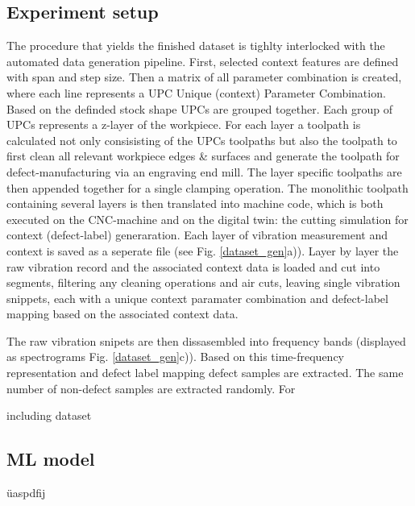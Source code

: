 \documentclass[5p,times,procedia]{elsarticle}
\begin{document}
\subsection{Experiment setup}
\vspace*{-\baselineskip}
The procedure that yields the finished dataset is tighlty interlocked with the automated data generation pipeline.
First, selected context features are defined with span and step size. Then a matrix of all parameter combination is created, where each line represents a UPC Unique (context) Parameter Combination. 
Based on the definded stock shape UPCs are grouped together. Each group of UPCs represents a z-layer of the workpiece. For each layer a toolpath is calculated not only consisisting of the UPCs toolpaths but also the toolpath to first clean all relevant workpiece edges \& surfaces and generate the toolpath for defect-manufacturing via an engraving end mill.
The layer specific toolpaths are then appended together for a single clamping operation.
The monolithic toolpath containing several layers is then translated into machine code, which is both executed on the CNC-machine and on the digital twin: the cutting simulation for context (defect-label) generaration. Each layer of vibration measurement and context is saved as a seperate file (see Fig. \ref{dataset_gen}a)).
Layer by layer the raw vibration record and the associated context data is loaded and cut into segments, filtering any cleaning operations and air cuts, leaving single vibration snippets, each with a unique context paramater combination and defect-label mapping based on the associated context data.

The raw vibration snipets are then dissasembled into frequency bands (displayed as spectrograms Fig. \ref{dataset_gen}c)). Based on this time-frequency representation and defect label mapping defect samples are extracted. The same number of non-defect samples are extracted randomly. For 


including dataset



\subsection{ML model}
\vspace*{-\baselineskip}
üaspdfij
\end{document}
